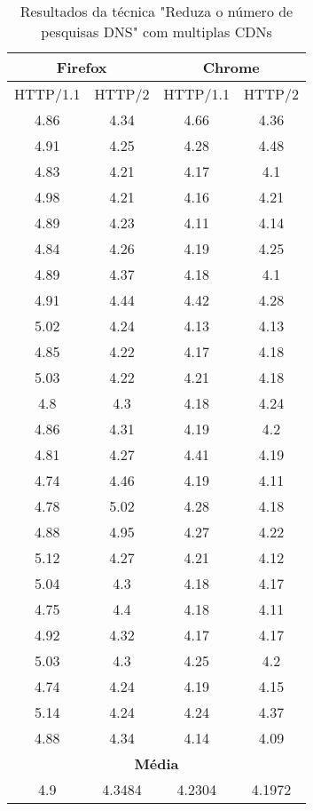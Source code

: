 \begin{table}[h]
	\centering
	\caption{Resultados da técnica "Reduza o número de pesquisas DNS" com multiplas CDNs}
	\label{resultados-reduzaonumerodepesquisasdns-multiplas}
	\begin{tabular}{cccc}
		\hline
		\multicolumn{2}{c}{\textbf{Firefox}} & \multicolumn{2}{c}{\textbf{Chrome}} \\
		\hline
		HTTP/1.1 & HTTP/2 & HTTP/1.1 & HTTP/2 \\
		\hline
		4.86 & 4.34 & 4.66 & 4.36 \\
		4.91 & 4.25 & 4.28 & 4.48 \\
		4.83 & 4.21 & 4.17 & 4.1  \\
		4.98 & 4.21 & 4.16 & 4.21 \\
		4.89 & 4.23 & 4.11 & 4.14 \\
		4.84 & 4.26 & 4.19 & 4.25 \\
		4.89 & 4.37 & 4.18 & 4.1  \\
		4.91 & 4.44 & 4.42 & 4.28 \\
		5.02 & 4.24 & 4.13 & 4.13 \\
		4.85 & 4.22 & 4.17 & 4.18 \\
		5.03 & 4.22 & 4.21 & 4.18 \\
		4.8  & 4.3  & 4.18 & 4.24 \\
		4.86 & 4.31 & 4.19 & 4.2  \\
		4.81 & 4.27 & 4.41 & 4.19 \\
		4.74 & 4.46 & 4.19 & 4.11 \\
		4.78 & 5.02 & 4.28 & 4.18 \\
		4.88 & 4.95 & 4.27 & 4.22 \\
		5.12 & 4.27 & 4.21 & 4.12 \\
		5.04 & 4.3  & 4.18 & 4.17 \\
		4.75 & 4.4  & 4.18 & 4.11 \\
		4.92 & 4.32 & 4.17 & 4.17 \\
		5.03 & 4.3  & 4.25 & 4.2  \\
		4.74 & 4.24 & 4.19 & 4.15 \\
		5.14 & 4.24 & 4.24 & 4.37 \\
		4.88 & 4.34 & 4.14 & 4.09 \\
		\hline
		\multicolumn{4}{c}{\textbf{Média}} \\
		4.9 & 4.3484 & 4.2304 & 4.1972 \\
		\hline
	\end{tabular}
\end{table}